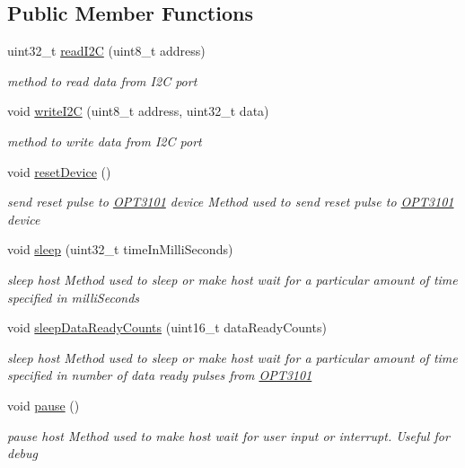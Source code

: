 \subsection*{Public Member Functions}
\begin{DoxyCompactItemize}
\item 
uint32\+\_\+t \mbox{\hyperlink{classhost_controller_a2bee6b3ec45fac241484f7dad943d8ed}{read\+I2C}} (uint8\+\_\+t address)
\begin{DoxyCompactList}\small\item\em method to read data from I2C port \end{DoxyCompactList}\item 
void \mbox{\hyperlink{classhost_controller_a7c4126810a72333e3ebe749159a0a516}{write\+I2C}} (uint8\+\_\+t address, uint32\+\_\+t data)
\begin{DoxyCompactList}\small\item\em method to write data from I2C port \end{DoxyCompactList}\item 
void \mbox{\hyperlink{classhost_controller_aa9f25eaf4a9bda5213c70ff91c261649}{reset\+Device}} ()
\begin{DoxyCompactList}\small\item\em send reset pulse to \mbox{\hyperlink{namespace_o_p_t3101}{O\+P\+T3101}} device Method used to send reset pulse to \mbox{\hyperlink{namespace_o_p_t3101}{O\+P\+T3101}} device \end{DoxyCompactList}\item 
void \mbox{\hyperlink{classhost_controller_a024c031559fade5da0ff7de491212dfe}{sleep}} (uint32\+\_\+t time\+In\+Milli\+Seconds)
\begin{DoxyCompactList}\small\item\em sleep host Method used to sleep or make host wait for a particular amount of time specified in milli\+Seconds \end{DoxyCompactList}\item 
void \mbox{\hyperlink{classhost_controller_aa678c25de9014a442ed33a4db695aeb3}{sleep\+Data\+Ready\+Counts}} (uint16\+\_\+t data\+Ready\+Counts)
\begin{DoxyCompactList}\small\item\em sleep host Method used to sleep or make host wait for a particular amount of time specified in number of data ready pulses from \mbox{\hyperlink{namespace_o_p_t3101}{O\+P\+T3101}} \end{DoxyCompactList}\item 
void \mbox{\hyperlink{classhost_controller_aead6dcbe7d02d5b2ae92b5cde1d99f05}{pause}} ()
\begin{DoxyCompactList}\small\item\em pause host Method used to make host wait for user input or interrupt. Useful for debug \end{DoxyCompactList}\end{DoxyCompactItemize}


